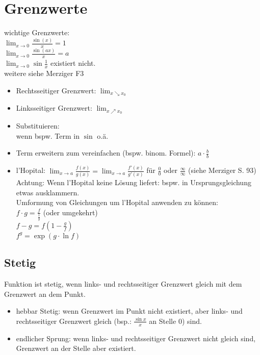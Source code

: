 \chapter{Grenzwerte}
wichtige Grenzwerte:\\
$\lim_{x\to0}\frac{\sin (x)}{x}=1$\\ 
$\lim_{x\to 0} \frac{\sin (ax)}{x}=a$\\
$\lim_{x\to 0} \sin \frac{1}{x}$ existiert nicht.\\
weitere siehe Merziger F3
\begin{itemize}
\item Rechtsseitiger Grenzwert: $\lim_{x\searrow x_0}$
\item Linksseitiger Grenzwert: $\lim_{x\nearrow x_0}$
\end{itemize}
\begin{itemize}
\item Substituieren:\\
wenn bspw. Term in $\sin$ o.ä.
\item Term erweitern zum vereinfachen (bspw. binom. Formel): $a\cdot \frac{b}{b}$
\item l'Hopital: $\lim_{x\to a} \frac{f(x)}{g(x)}=\lim_{x \to a} \frac{f'(x)}{g'(x)}$ für $\frac{0}{0}$ oder $\frac{\infty}{\infty}$ (siehe Merziger S. 93)\\
Achtung: Wenn l'Hopital keine Lösung liefert: bspw. in Ursprungsgleichung etwas ausklammern.\\
Umformung von Gleichungen um l'Hopital anwenden zu können:\\
$f\cdot g = \frac{f}{\frac{1}{g}}$ (oder umgekehrt)\\
$f-g=f\left(1-\frac{g}{f}\right)$\\
$f^g=\exp(g\cdot \ln f)$
\end{itemize}
\section{Stetig}
Funktion ist stetig, wenn links- und rechtsseitiger Grenzwert gleich mit dem Grenzwert an dem Punkt.
\begin{itemize}
\item hebbar Stetig: wenn Grenzwert im Punkt nicht existiert, aber links- und rechtsseitiger Grenzwert gleich (bsp.: $\frac{\sin x}{x}$ an Stelle $0$) sind.
\item endlicher Sprung: wenn links- und rechtsseitiger Grenzwert nicht gleich sind, Grenzwert an der Stelle aber existiert.
\end{itemize}

